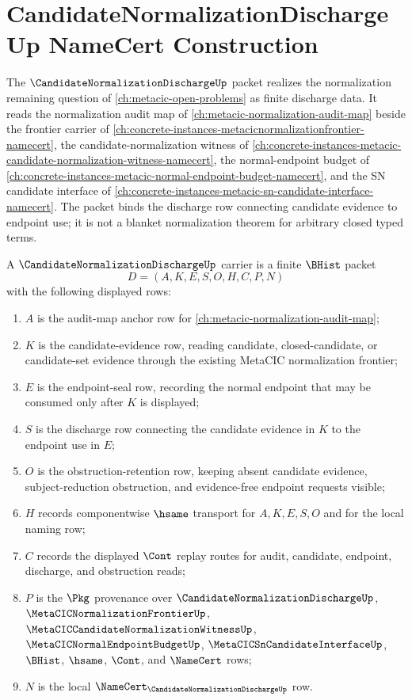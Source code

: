 \chapter{CandidateNormalizationDischargeUp NameCert Construction}
\label{ch:concrete-instances-candidate-normalization-discharge-namecert}

The $\CandidateNormalizationDischargeUp$ packet realizes the normalization remaining question of \autoref{ch:metacic-open-problems} as finite discharge data. It reads the normalization audit map of \autoref{ch:metacic-normalization-audit-map} beside the frontier carrier of \autoref{ch:concrete-instances-metacicnormalizationfrontier-namecert}, the candidate-normalization witness of \autoref{ch:concrete-instances-metacic-candidate-normalization-witness-namecert}, the normal-endpoint budget of \autoref{ch:concrete-instances-metacic-normal-endpoint-budget-namecert}, and the SN candidate interface of \autoref{ch:concrete-instances-metacic-sn-candidate-interface-namecert}. The packet binds the discharge row connecting candidate evidence to endpoint use; it is not a blanket normalization theorem for arbitrary closed typed terms.

\begin{definition}
\label{def:candidate-normalization-discharge-carrier}
A $\CandidateNormalizationDischargeUp$ carrier is a finite $\BHist$ packet
$$
D=(A,K,E,S,O,H,C,P,N)
$$
with the following displayed rows:
\begin{enumerate}
\item $A$ is the audit-map anchor row for \autoref{ch:metacic-normalization-audit-map};
\item $K$ is the candidate-evidence row, reading candidate, closed-candidate, or candidate-set evidence through the existing MetaCIC normalization frontier;
\item $E$ is the endpoint-seal row, recording the normal endpoint that may be consumed only after $K$ is displayed;
\item $S$ is the discharge row connecting the candidate evidence in $K$ to the endpoint use in $E$;
\item $O$ is the obstruction-retention row, keeping absent candidate evidence, subject-reduction obstruction, and evidence-free endpoint requests visible;
\item $H$ records componentwise $\hsame$ transport for $A,K,E,S,O$ and for the local naming row;
\item $C$ records the displayed $\Cont$ replay routes for audit, candidate, endpoint, discharge, and obstruction reads;
\item $P$ is the $\Pkg$ provenance over $\CandidateNormalizationDischargeUp$, $\MetaCICNormalizationFrontierUp$, $\MetaCICCandidateNormalizationWitnessUp$, $\MetaCICNormalEndpointBudgetUp$, $\MetaCICSnCandidateInterfaceUp$, $\BHist$, $\hsame$, $\Cont$, and $\NameCert$ rows;
\item $N$ is the local $\NameCert_{\CandidateNormalizationDischargeUp}$ row.
\end{enumerate}
\end{definition}

